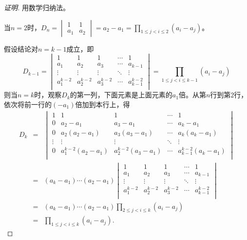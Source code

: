 \begin{proof}[证明]
用数学归纳法。

当$n=2$时，$D_n = \begin{vmatrix} 1 & 1\\ a_1 & a_2 \end{vmatrix} = a_2 - a_1 = \prod_{1\leqslant j < i \leqslant 2} (a_i - a_j)$。

假设结论对$n=k-1$成立，即
$$D_{k-1} = \begin{vmatrix}
1 & 1 & 1 & \cdots & 1 \\
a_1 & a_2 & a_3 & \cdots & a_{k-1} \\
\vdots & \vdots & \vdots & \ddots & \vdots \\
a_1^{k-2} & a_2^{k-2} & a_3^{k-2} & \cdots & a_{k-1}^{k-2} \\
\end{vmatrix} = \prod_{1\leqslant j < i \leqslant k-1} (a_i - a_j)$$
则当$n=k$时，观察$D_k$的第一列，下面元素是上面元素的$a_1$倍。从第$n$行到第$2$行，依次将前一行的$(-a_1)$倍加到本行上，得
\begin{eqnarray*}
D_{k} & = & \begin{vmatrix}
1 & 1 & 1 & \cdots & 1 \\
0 & a_2-a_1 & a_3-a_1 & \cdots & a_k-a_1 \\
0 & a_2(a_2-a_1) & a_3(a_3-a_1) & \cdots & a_k(a_k-a_1) \\
\vdots & \vdots & \vdots & \ddots & \vdots \\
0 & a_1^{k-2}(a_2-a_1) & a_2^{k-2}(a_3-a_1) & \cdots & a_{k-1}^{k-2}(a_k-a_1) \\
\end{vmatrix} \\
& = & (a_k - a_1)\cdots(a_2-a_1)\begin{vmatrix}
1 & 1 & 1 & \cdots & 1 \\
a_1 & a_2 & a_3 & \cdots & a_{k-1} \\
\vdots & \vdots & \vdots & \ddots & \vdots \\
a_1^{k-2} & a_2^{k-2} & a_3^{k-2} & \cdots & a_{k-1}^{k-2} \\
\end{vmatrix} \\
& = & (a_k - a_1)\cdots(a_2-a_1)\prod_{2\leqslant j < i \leqslant k} (a_i - a_j) \\
& = & \prod_{1\leqslant j < i \leqslant k} (a_i - a_j).
\end{eqnarray*}
\end{proof}

